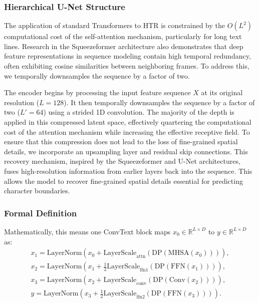 \documentclass[final,5p,times]{elsarticle}
\begin{document}
\subsubsection{Hierarchical U-Net Structure} \label{unet}

The application of standard Transformers to HTR is constrained by the $O(L^2)$ computational cost of the self-attention mechanism, particularly for long text lines. Research in the Squeezeformer architecture also demonstrates that deep feature representations in sequence modeling contain high temporal redundancy, often exhibiting cosine similarities between neighboring frames. To address this, we temporally downsamples the sequence by a factor of two.

The encoder begins by processing the input feature sequence $X$ at its original resolution ($L=128$). It then temporally downsamples the sequence by a factor of two ($L'=64$) using a strided 1D convolution. The majority of the depth is applied in this compressed latent space, effectively quartering the computational cost of the attention mechanism while increasing the effective receptive field. To ensure that this compression does not lead to the loss of fine-grained spatial details, we incorporate an upsampling layer and residual skip connections. This recovery mechanism, inspired by the Squeezeformer and U-Net architectures, fuses high-resolution information from earlier layers back into the sequence. This allows the model to recover fine-grained spatial details essential for predicting character boundaries.

\subsubsection{Formal Definition}
Mathematically, this means one ConvText block maps $x_0 \in \mathbb{R}^{L \times D}$ to $y \in \mathbb{R}^{L \times D}$ as:
\begin{equation}
\begin{gathered}
    x_1 = \text{LayerNorm}(x_0 + \text{LayerScale}_{\text{attn}}(\text{DP}(\text{MHSA}(x_0)))), \\
    x_2 = \text{LayerNorm}(x_1 + \tfrac{1}{2} \text{LayerScale}_{\text{ffn}1}(\text{DP}(\text{FFN}(x_1)))), \\
    x_3 = \text{LayerNorm}(x_2 + \text{LayerScale}_{\text{conv}}(\text{DP}(\text{Conv}(x_2)))), \\
    y   = \text{LayerNorm}(x_3 + \tfrac{1}{2} \text{LayerScale}_{\text{ffn}2}(\text{DP}(\text{FFN}(x_3)))).
\end{gathered}
\label{eq:convtext_block}
\end{equation}
\end{document}
